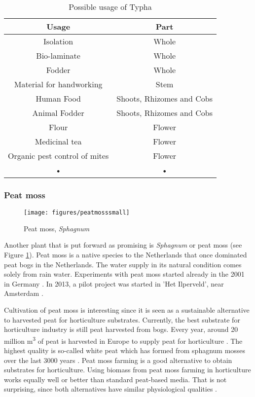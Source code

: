 \documentclass[a4paper,12pt]{scrbook}
\begin{document}
\begin{table}
\centering
\caption{Possible usage of Typha}
\begin{tabular}{|c|c|}
\hline 
\textbf{Usage} & \textbf{Part} \\ 
\hline 
Isolation & Whole \\ 
\hline 
Bio-laminate & Whole \\ 
\hline 
Fodder & Whole \\ 
\hline 
Material for handworking & Stem \\ 
\hline 
Human Food & Shoots, Rhizomes and Cobs \\ 
\hline 
Animal Fodder & Shoots, Rhizomes and Cobs \\ 
\hline 
Flour & Flower \\ 
\hline 
Medicinal tea & Flower \\ 
\hline 
Organic pest control of mites & Flower \\ 
\hline 
• & • \\ 
\hline 
\end{tabular} 
\label{tab:typha}
\end{table}

\subsubsection{Peat moss}

\begin{figure}
    \centering
    \texttt{[image: figures/peatmosssmall]} 
    \caption{Peat moss, \textit{Sphagnum}}
    \label{fig:peatmoss}
\end{figure}

Another plant that is put forward as promising is \textit{Sphagnum} or peat moss (see Figure \ref{fig:peatmoss}). Peat moss is a native species to the Netherlands that once dominated peat bogs in the Netherlands. The water supply in its natural condition comes solely from rain water. Experiments with peat moss started already in the 2001 in Germany \citep{gaudig2014sphagnum}. In 2013, a pilot project was started in 'Het Ilperveld', near Amsterdam \citep{van2013werk}. 

Cultivation of peat moss is interesting since it is seen as a sustainable alternative to harvested peat for horticulture substrates. Currently, the best substrate for horticulture industry is still peat harvested from bogs. Every year, around 20 million m\textsuperscript{3} of peat is harvested in Europe to supply peat for horticulture \citep{altmann2008socio}. The highest quality is so-called white peat which has formed from sphagnum mosses over the last 3000 years \citep{gaudig2014sphagnum}. Peat moss farming is a good alternative to obtain substrates for horticulture. Using biomass from peat moss farming in horticulture works equally well or better than standard peat-based media. That is not surprising, since both alternatives have similar physiological qualities \citep{gaudig2014sphagnum}. 
\end{document}
